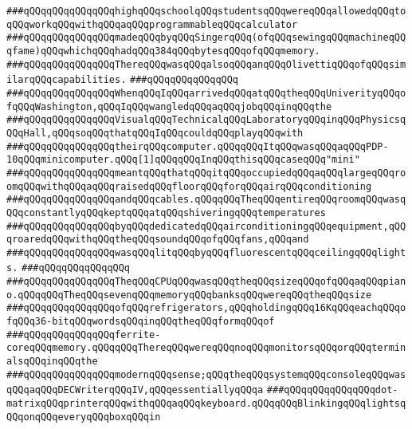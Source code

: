\verb|###qQQqqQQqqQQqqQQqhighqQQqschoolqQQqstudentsqQQqwereqQQqallowedqQQqtoqQQqworkqQQqwithqQQqaqQQqprogrammableqQQqcalculator|\newline
\verb|###qQQqqQQqqQQqqQQqmadeqQQqbyqQQqSingerqQQq(ofqQQqsewingqQQqmachineqQQqfame)qQQqwhichqQQqhadqQQq384qQQqbytesqQQqofqQQqmemory.|\newline
\verb|###qQQqqQQqqQQqqQQqThereqQQqwasqQQqalsoqQQqanqQQqOlivettiqQQqofqQQqsimilarqQQqcapabilities.|\newline
\verb|###qQQqqQQqqQQqqQQq|\newline
\verb|###qQQqqQQqqQQqqQQqWhenqQQqIqQQqarrivedqQQqatqQQqtheqQQqUniverityqQQqofqQQqWashington,qQQqIqQQqwangledqQQqaqQQqjobqQQqinqQQqthe|\newline
\verb|###qQQqqQQqqQQqqQQqVisualqQQqTechnicalqQQqLaboratoryqQQqinqQQqPhysicsqQQqHall,qQQqsoqQQqthatqQQqIqQQqcouldqQQqplayqQQqwith|\newline
\verb|###qQQqqQQqqQQqqQQqtheirqQQqcomputer.qQQqqQQqItqQQqwasqQQqaqQQqPDP-10qQQqminicomputer.qQQq[1]qQQqqQQqInqQQqthisqQQqcaseqQQq"mini"|\newline
\verb|###qQQqqQQqqQQqqQQqmeantqQQqthatqQQqitqQQqoccupiedqQQqaqQQqlargeqQQqroomqQQqwithqQQqaqQQqraisedqQQqfloorqQQqforqQQqairqQQqconditioning|\newline
\verb|###qQQqqQQqqQQqqQQqandqQQqcables.qQQqqQQqTheqQQqentireqQQqroomqQQqwasqQQqconstantlyqQQqkeptqQQqatqQQqshiveringqQQqtemperatures|\newline
\verb|###qQQqqQQqqQQqqQQqbyqQQqdedicatedqQQqairconditioningqQQqequipment,qQQqroaredqQQqwithqQQqtheqQQqsoundqQQqofqQQqfans,qQQqand|\newline
\verb|###qQQqqQQqqQQqqQQqwasqQQqlitqQQqbyqQQqfluorescentqQQqceilingqQQqlights.|\newline
\verb|###qQQqqQQqqQQqqQQq|\newline
\verb|###qQQqqQQqqQQqqQQqTheqQQqCPUqQQqwasqQQqtheqQQqsizeqQQqofqQQqaqQQqpiano.qQQqqQQqTheqQQqsevenqQQqmemoryqQQqbanksqQQqwereqQQqtheqQQqsize|\newline
\verb|###qQQqqQQqqQQqqQQqofqQQqrefrigerators,qQQqholdingqQQq16KqQQqeachqQQqofqQQq36-bitqQQqwordsqQQqinqQQqtheqQQqformqQQqof|\newline
\verb|###qQQqqQQqqQQqqQQqferrite-coreqQQqmemory.qQQqqQQqThereqQQqwereqQQqnoqQQqmonitorsqQQqorqQQqterminalsqQQqinqQQqthe|\newline
\verb|###qQQqqQQqqQQqqQQqmodernqQQqsense;qQQqtheqQQqsystemqQQqconsoleqQQqwasqQQqaqQQqDECWriterqQQqIV,qQQqessentiallyqQQqa|\newline
\verb|###qQQqqQQqqQQqqQQqdot-matrixqQQqprinterqQQqwithqQQqaqQQqkeyboard.qQQqqQQqBlinkingqQQqlightsqQQqonqQQqeveryqQQqboxqQQqin|\newline
